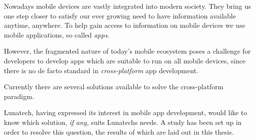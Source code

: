 \samenvatting



Nowadays mobile devices are vastly integrated into modern society. They bring us one step closer to satisfy our ever growing need to have information available anytime, anywhere. To help gain access to information on mobile devices we use mobile applications, so called \emph{apps}. 

However, the fragmented nature of today's mobile ecosystem poses a challenge for developers to develop apps which are suitable to run on all mobile devices, since there is no de facto standard in \emph{cross-platform} app development.

Currently there are several solutions available to solve the cross-platform paradigm.

Lunatech, having expressed its interest in mobile app development, would like to know which solution, \emph{if any}, suits Lunatechs needs. A study has been set up in order to resolve this question, the results of which are laid out in this thesis.
